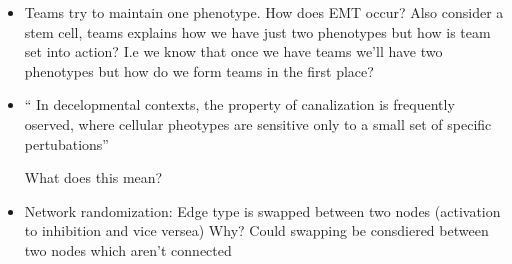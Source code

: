 \documentclass{article}
\begin{document}
\begin{itemize}
\item Teams try to maintain one phenotype. How does EMT occur? Also consider a stem cell, teams explains how we have just two phenotypes but how is team set into action? I.e we know that once we have teams we'll have two phenotypes but how do we form teams in the first place?

\item`` In decelopmental contexts, the property of canalization is frequently oserved, where cellular pheotypes are sensitive only to a small set of specific pertubations'' 

	What does this mean?

\item Network randomization: Edge type is swapped between two nodes (activation to inhibition and vice versea) Why? Could swapping be consdiered between two nodes which aren't connected 



\end{itemize}
\end{document}
